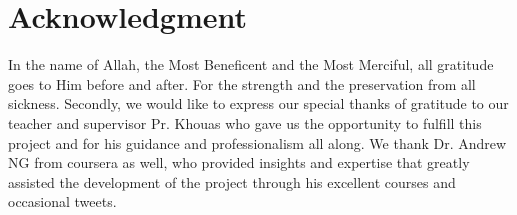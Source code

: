 \chapter*{Acknowledgment}
In the name of Allah, the Most Beneficent and the Most Merciful, all gratitude goes to Him before and after. For the strength and the preservation from all sickness. Secondly, we would like to express our special thanks of gratitude to our teacher and supervisor Pr. Khouas who gave us the opportunity to fulfill this project and for his guidance and professionalism all along. We thank Dr. Andrew NG from coursera as well, who provided insights and expertise that greatly assisted the development of the project through his excellent courses and occasional tweets.
